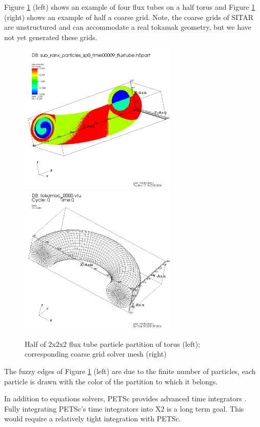 \documentclass[review]{siamart}
\begin{document}
\clearpage
Figure \ref{fig:cross} (left) shows an example of four flux tubes on a half torus and Figure \ref{fig:cross} (right) shows an example of half a coarse grid.
Note, the coarse grids of SITAR are unstructured and can accommodate a real tokamak geometry, but we have not yet generated these grids.
\begin{figure}[h!]
   \centering
   \includegraphics[width=75mm]{half_grid.jpeg} 
    \includegraphics[width=75mm]{half_grid_mesh.jpeg} 
   \caption{Half of  2x2x2 flux tube particle partition of torus (left); corresponding coarse grid solver mesh (right)}
   \label{fig:cross}
\end{figure}
The fuzzy edges of Figure \ref{fig:cross} (left) are due to the finite number of particles, each particle is drawn with the color of the partition to which it belongs.

In addition to equations solvers, PETSc provides advanced time integrators \cite{KnepleyBrownMcInnesSmithRuppAdams2015b}.
Fully integrating PETSc's time integrators into X2 is a long term goal.
This would require a relatively tight integration with PETSc.
\end{document}
